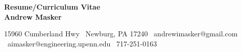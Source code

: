 \begin{center}
    \textbf{Resume/Curriculum Vitae}\\ 
    \textbf{Andrew Masker}\\
    \hrulefill
\end{center}

\begin{center}
    15960 Cumberland Hwy \textbullet \ Newburg, PA 17240 \textbullet  \ andrewimasker@gmail.com \textbullet \ aimasker@engineering.upenn.edu \textbullet \ 717-251-0163
\end{center}
